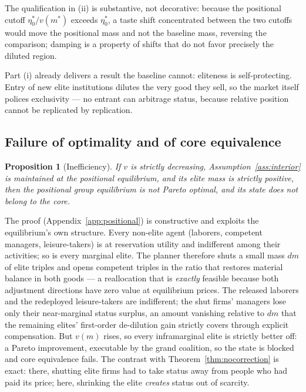 \documentclass[12pt,letterpaper]{article}
\newtheorem{proposition}{Proposition}
\theoremstyle{definition}
\begin{document}
The qualification in (ii) is substantive, not decorative: because the positional cutoff $\eta^\ast_0/v(m^\ast)$ exceeds $\eta^\ast_0$, a taste shift concentrated between the two cutoffs would move the positional mass and not the baseline mass, reversing the comparison; damping is a property of shifts that do not favor precisely the diluted region.

Part (i) already delivers a result the baseline cannot: eliteness is self-protecting.
Entry of new elite institutions dilutes the very good they sell, so the market itself polices exclusivity --- no entrant can arbitrage status, because relative position cannot be replicated by replication.

\subsection{Failure of optimality and of core equivalence}

\begin{proposition}[Inefficiency]\label{prop:inefficiency} If $v$ is strictly decreasing, Assumption~\ref{ass:interior} is maintained at the positional equilibrium, and its elite mass is strictly positive, then the positional group equilibrium is not Pareto optimal, and its state does not belong to the core.
\end{proposition}

The proof (Appendix~\ref{app:positional}) is constructive and exploits the equilibrium's own structure.
Every non-elite agent (laborers, competent managers, leisure-takers) is at reservation utility and indifferent among their activities; so is every marginal elite.
The planner therefore shuts a small mass $dm$ of elite triples and opens competent triples in the ratio that restores material balance in both goods --- a reallocation that is \emph{exactly} feasible because both adjustment directions have zero value at equilibrium prices.
The released laborers and the redeployed leisure-takers are indifferent; the shut firms' managers lose only their near-marginal status surplus, an amount vanishing relative to $dm$ that the remaining elites' first-order de-dilution gain strictly covers through explicit compensation.
But $v(m)$ rises, so every inframarginal elite is strictly better off: a Pareto improvement, executable by the grand coalition, so the state is blocked and core equivalence fails.
The contrast with Theorem~\ref{thm:nocorrection} is exact: there, shutting elite firms had to take status away from people who had paid its price; here, shrinking the elite \emph{creates} status out of scarcity.
\end{document}
